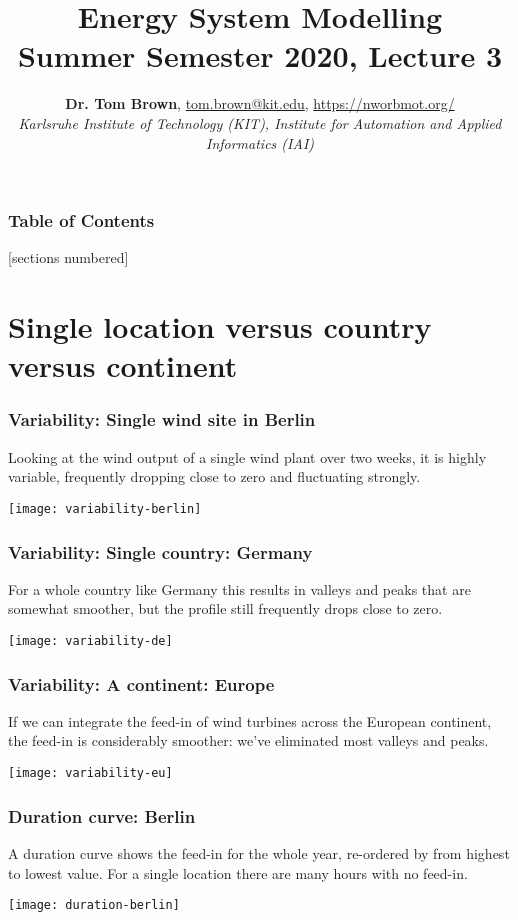 \documentclass[10pt,aspectratio=169,dvipsnames]{beamer}
\title{Energy System Modelling\\ Summer Semester 2020, Lecture 3}
\author{
  {\bf Dr. Tom Brown}, \href{mailto:tom.brown@kit.edu}{tom.brown@kit.edu}, \url{https://nworbmot.org/}\\
  \emph{Karlsruhe Institute of Technology (KIT), Institute for Automation and Applied Informatics (IAI)}
}
\date{}
\begin{document}
\maketitle


\begin{frame}

  \frametitle{Table of Contents}
  [sections numbered]
  \tableofcontents[hideallsubsections]
\end{frame}


\section{Single location versus country versus continent}




\begin{frame}
  \frametitle{Variability: Single wind site in Berlin}

  Looking at the wind output of a single wind plant over two weeks, it is highly
  variable, frequently dropping close to zero and fluctuating strongly.

  \centering
  \texttt{[image: variability-berlin]}


\end{frame}



\begin{frame}
  \frametitle{Variability: Single country: Germany}

  For a whole country like Germany this results in valleys and peaks that are  somewhat smoother, but the profile still frequently
  drops close to zero.

  \centering
  \texttt{[image: variability-de]}


\end{frame}



\begin{frame}
  \frametitle{Variability: A continent: Europe}


  If we can integrate the feed-in of wind turbines across the European continent, the
  feed-in is considerably smoother: we've eliminated most valleys and
  peaks.

  \centering
  \texttt{[image: variability-eu]}


\end{frame}


\begin{frame}
  \frametitle{Duration curve: Berlin}

  A \alert{duration curve} shows the feed-in for the whole year, re-ordered by from highest to lowest value. For a single location there are many hours with no feed-in.

  \centering
  \texttt{[image: duration-berlin]}


\end{frame}
\end{document}
